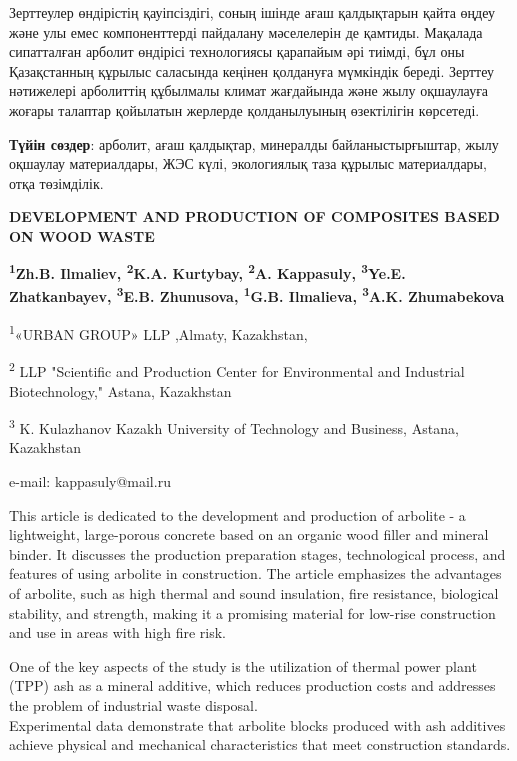 Зерттеулер өндірістің қауіпсіздігі, соның ішінде ағаш қалдықтарын қайта
өңдеу және улы емес компоненттерді пайдалану мәселелерін де қамтиды.
Мақалада сипатталған арболит өндірісі технологиясы қарапайым әрі тиімді,
бұл оны Қазақстанның құрылыс саласында кеңінен қолдануға мүмкіндік
береді. Зерттеу нәтижелері арболиттің құбылмалы климат жағдайында және
жылу оқшаулауға жоғары талаптар қойылатын жерлерде қолданылуының
өзектілігін көрсетеді.

{\bfseries Түйін сөздер}: арболит, ағаш қалдықтар, минералды
байланыстырғыштар, жылу оқшаулау материалдары, ЖЭС күлі, экологиялық
таза құрылыс материалдары, отқа төзімділік.

\begin{articleheader}
{\bfseries DEVELOPMENT AND PRODUCTION OF COMPOSITES BASED ON WOOD WASTE}

{\bfseries
\textsuperscript{1}Zh.B. Ilmaliev,
\textsuperscript{2}K.A. Kurtybay,
\textsuperscript{2}A. Kappasuly\textsuperscript{\envelope },
\textsuperscript{3}Ye.E. Zhatkanbayev,
\textsuperscript{3}E.B. Zhunusova,
\textsuperscript{1}G.B. Ilmalieva,
\textsuperscript{3}A.K. Zhumabekova
}
\end{articleheader}

\begin{affiliation}
\textsuperscript{1}«URBAN GROUP» LLP ,Almaty, Kazakhstan,

\textsuperscript{2} LLP "Scientific and Production Center for Environmental and Industrial Biotechnology," Astana, Kazakhstan

\textsuperscript{3} K. Kulazhanov Kazakh University of Technology and Business, Astana, Kazakhstan

e-mail: kappasuly@mail.ru
\end{affiliation}

This article is dedicated to the development and production of
arbolite - a lightweight, large-porous concrete based on an organic wood
filler and mineral binder. It discusses the production preparation
stages, technological process, and features of using arbolite in
construction. The article emphasizes the advantages of arbolite, such as
high thermal and sound insulation, fire resistance, biological
stability, and strength, making it a promising material for low-rise
construction and use in areas with high fire risk.

One of the key aspects of the study is the utilization of thermal power
plant (TPP) ash as a mineral additive, which reduces production costs
and addresses the problem of industrial waste disposal. \\Experimental
data demonstrate that arbolite blocks produced with ash additives
achieve physical and mechanical characteristics that meet construction
standards.


